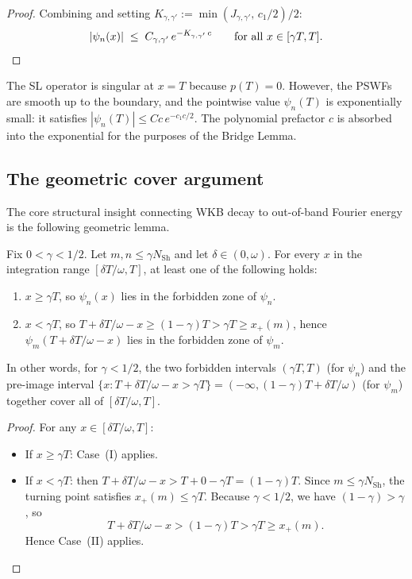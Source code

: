 \begin{proof}
Combining and setting $K_{\gamma,\gamma'} :=
\min(J_{\gamma,\gamma'},\, c_1/2)/2$:
\[
  |\psi_n(x)| \;\le\; C_{\gamma,\gamma'}\,e^{-K_{\gamma,\gamma'}\,c}
  \qquad\text{for all } x \in [\gamma T, T]. \qedhere
\]
\end{proof}

\begin{remark}[The endpoint $x = T$]
\label{rem:bridge:endpoint}
The SL operator is singular at $x = T$ because $p(T) = 0$.
However, the PSWFs are smooth up to the boundary, and the
pointwise value $\psi_n(T)$ is exponentially small: it satisfies
$|\psi_n(T)| \le C c\,e^{-c_1 c/2}$.
The polynomial prefactor $c$ is absorbed into the exponential
for the purposes of the Bridge Lemma.
\end{remark}

\subsection{The geometric cover argument}
\label{subsec:bridge-geo}

The core structural insight connecting WKB decay to
out-of-band Fourier energy is the following geometric lemma.

\begin{lemma}
\label{lem:bridge:cover}
Fix $0 < \gamma < 1/2$.
Let $m, n \le \gamma N_{\mathrm{Sh}}$ and let
$\delta \in (0, \omega)$.
For every $x$ in the integration range $[\delta T/\omega, T]$,
at least one of the following holds:
\begin{enumerate}
  \item[\textup{(I)}] $x \ge \gamma T$, so
    $\psi_n(x)$ lies in the forbidden zone of $\psi_n$.
  \item[\textup{(II)}] $x < \gamma T$, so
    $T + \delta T/\omega - x \ge (1-\gamma)T > \gamma T \ge x_+(m)$,
    hence $\psi_m(T + \delta T/\omega - x)$ lies in the
    forbidden zone of $\psi_m$.
\end{enumerate}
In other words, for $\gamma < 1/2$, the two forbidden intervals
$(\gamma T, T)$ \textup{(}for $\psi_n$\textup{)} and the
pre-image interval $\{x : T + \delta T/\omega - x > \gamma T\} =
(-\infty, (1-\gamma)T + \delta T/\omega)$ \textup{(}for
$\psi_m$\textup{)} together cover all of $[\delta T/\omega, T]$.
\end{lemma}

\begin{proof}
For any $x \in [\delta T/\omega, T]$:
\begin{itemize}
  \item If $x \ge \gamma T$: Case~(I) applies.
  \item If $x < \gamma T$: then
    $T + \delta T/\omega - x > T + 0 - \gamma T = (1-\gamma)T$.
    Since $m \le \gamma N_{\mathrm{Sh}}$, the turning point satisfies
    $x_+(m) \le \gamma T$.
    Because $\gamma < 1/2$, we have $(1-\gamma) > \gamma$, so
    \[
      T + \delta T/\omega - x > (1-\gamma)T > \gamma T \ge x_+(m).
    \]
    Hence Case~(II) applies. \qedhere
\end{itemize}
\end{proof}

